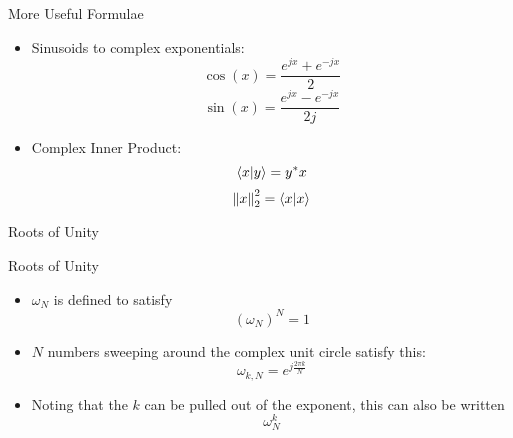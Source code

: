 \begin{frame}{More Useful Formulae}
  \begin{itemize}
    \item Sinusoids to complex exponentials:
    \begin{equation}
      \cos(x) = \frac{e^{jx}+e^{-jx}}{2}
    \end{equation}
    \begin{equation}
      \sin(x) = \frac{e^{jx}-e^{-jx}}{2j}
    \end{equation}
  \item Complex Inner Product:
    \begin{equation*}
      \innerproduct{x}{y} = y^* x
    \end{equation*}
    \begin{equation*}
      \norm{x}_2^2 = \innerproduct{x}{x} 
    \end{equation*}
  \end{itemize}
\end{frame}

\begin{frame}{Roots of Unity}
  \def\n{5}
\end{frame}

\begin{frame}{Roots of Unity}
  \begin{itemize}
    \item {} $\omega_N$ is defined to satisfy
      \begin{equation*}
        (\omega_N)^N = 1
      \end{equation*}
    \item $N$ numbers sweeping around the complex unit circle satisfy this:
      \begin{equation*}
        \omega_{k,N} = e^{j \frac{2 \pi k}{N}}
      \end{equation*}
    \item Noting that the $k$ can be pulled out of the exponent, this can also be written
      \begin{equation*}
        \omega_N^k
      \end{equation*}
  \end{itemize}
\end{frame}

